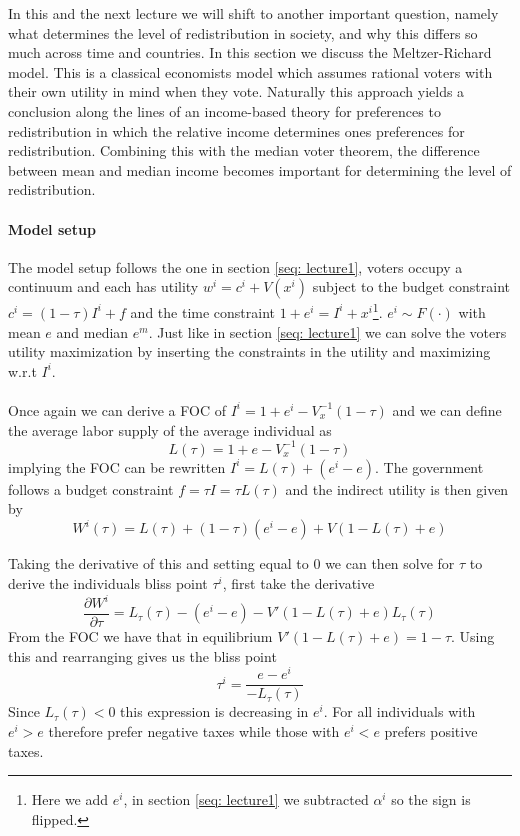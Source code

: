 In this and the next lecture we will shift to another important question, namely what determines the level of redistribution in society, and why this differs so much across time and countries. In this section we discuss the Meltzer-Richard model. This is a classical economists model which assumes rational voters with their own utility in mind when they vote. Naturally this approach yields a conclusion along the lines of an income-based theory for preferences to redistribution in which the relative income determines ones preferences for redistribution. Combining this with the median voter theorem, the difference between mean and median income becomes important for determining the level of redistribution.

\paragraph{Model setup}
The model setup follows the one in section \ref{seq: lecture1}, voters occupy a continuum and each has utility $w^i = c^i + V(x^i)$ subject to the budget constraint $c^i = (1-\tau)I^i + f$ and the time constraint $1+e^i=I^i + x^i$\footnote{Here we add $e^i$, in section \ref{seq: lecture1} we subtracted $\alpha^i$ so the sign is flipped.}. $e^i\sim F(\cdot)$ with mean $e$ and median $e^m$. Just like in section \ref{seq: lecture1} we can solve the voters utility maximization by inserting the constraints in the utility and maximizing w.r.t $I^i$.
\\ \\ 
Once again we can derive a FOC of $I^i = 1 + e^i - V_x^{-1}(1-\tau)$ and we can define the average labor supply of the average individual as 
\begin{equation}
    L(\tau) = 1 + e - V_x^{-1}(1-\tau)
\end{equation}
implying the FOC can be rewritten $I^i = L(\tau)+(e^i - e)$. The government follows a budget constraint $f=\tau I=\tau L(\tau)$ and the indirect utility is then given by 
\begin{equation}
    W^i(\tau) = L(\tau) + (1-\tau)(e^i - e) + V(1-L(\tau) + e)
\end{equation}

Taking the derivative of this and setting equal to 0 we can then solve for $\tau$ to derive the individuals bliss point $\tau^i$, first take the derivative 
\begin{equation}
    \frac{\partial W^i}{\partial \tau} = L_{\tau}(\tau) - (e^i - e) - V'(1-L(\tau) + e)L_{\tau}(\tau)
\end{equation}
From the FOC we have that in equilibrium $V'(1-L(\tau) + e) = 1- \tau$. Using this and rearranging gives us the bliss point 
\begin{equation}
    \tau^i = \frac{e-e^i}{-L_{\tau}(\tau)}
\end{equation}
Since $L_{\tau}(\tau)<0$ this expression is decreasing in $e^i$. For all individuals with $e^i>e$ therefore prefer negative taxes while those with $e^i<e$ prefers positive taxes. 

